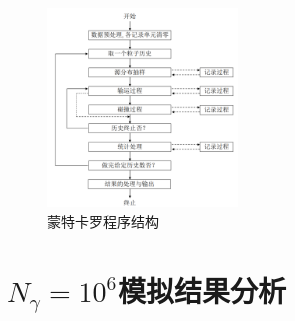 \documentclass{article}
\begin{document}
\begin{figure}[H]
    \centering
    \includegraphics[width=0.45\textwidth]{chengxuliucheng.png}
    \caption{蒙特卡罗程序结构}
    \label{}
\end{figure}

\section{$ N_{\gamma }=10^6$模拟结果分析}
\end{document}
